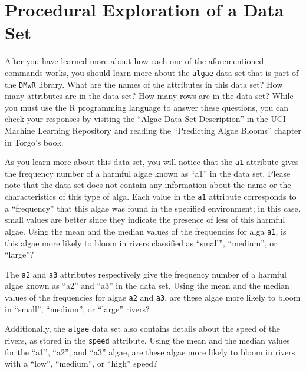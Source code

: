 
\section*{Procedural Exploration of a Data Set}

After you have learned more about how each one of the aforementioned commands works, you should learn more about the
{\tt algae} data set that is part of the {\tt DMwR} library. What are the names of the attributes in this data set? How
many attributes are in the data set? How many rows are in the data set? While you must use the R programming language to
answer these questions, you can check your responses by visiting the ``Algae Data Set Description'' in the UCI Machine
Learning Repository and reading the ``Predicting Algae Blooms'' chapter in Torgo's book. 

As you learn more about this data set, you will notice that the {\tt a1} attribute gives the frequency number of a
harmful algae known as ``a1'' in the data set. Please note that the data set does not contain any information about the
name or the characteristics of this type of alga. Each value in the {\tt a1} attribute corresponds to a ``frequency''
that this algae was found in the specified environment; in this case, small values are better since they indicate the
presence of less of this harmful algae. Using the mean and the median values of the frequencies for alga {\tt a1}, is
this algae more likely to bloom in rivers classified as ``small'', ``medium'', or ``large''?

The {\tt a2} and {\tt a3} attributes respectively give the frequency number of a harmful algae known as ``a2'' and
``a3'' in the data set. Using the mean and the median values of the frequencies for algae {\tt a2} and {\tt a3}, are
these algae more likely to bloom in ``small'', ``medium'', or ``large'' rivers?

Additionally, the {\tt algae} data set also contains details about the speed of the rivers, as stored in the {\tt speed}
attribute. Using the mean and the median values for the ``a1'', ``a2'', and ``a3'' algae, are these algae more
likely to bloom in rivers with a ``low'', ``medium'', or ``high'' speed?

